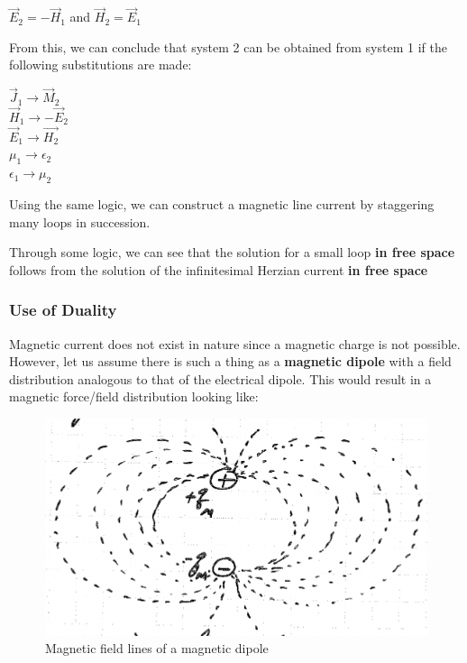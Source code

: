 \documentclass{article}
\begin{document}
\begin{center}
    $\Vec{E}_2 = -\Vec{H}_1$ and $
    \Vec{H}_2 = \Vec{E}_1$
\end{center}

From this, we can conclude that system 2 can be obtained from system 1 if the following substitutions are made:

\begin{center}
    $\Vec{J}_1 \to \Vec{M}_2$ \\
    $\Vec{H}_1 \to -\Vec{E}_2$ \\
    $\Vec{E}_1 \to \Vec{H_2}$ \\
    $\mu_1 \to \epsilon_2$ \\
    $\epsilon_1 \to \mu_2$
\end{center}

Using the same logic, we can construct a magnetic line current by staggering many loops in succession.

Through some logic, we can see that the solution for a small loop \textbf{in free space} follows from the solution of the infinitesimal Herzian current \textbf{in free space}

\subsubsection{Use of Duality}

Magnetic current does not exist in nature since a magnetic charge is not possible. However, let us assume there is such a thing as a \textbf{magnetic dipole} with a field distribution analogous to that of the electrical dipole. This would result in a magnetic force/field distribution looking like:

\begin{figure}[H]
  \centering
     \includegraphics[scale=0.8]{Course Notes/images/8.4.png}
  \caption{Magnetic field lines of a magnetic dipole}
\end{figure}
\end{document}
